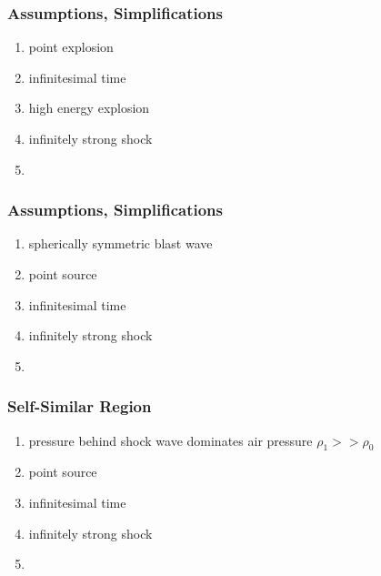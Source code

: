 \begin{frame}\frametitle{Assumptions, Simplifications}
\begin{enumerate}
	\item point explosion
	\item infinitesimal time
	\item high energy explosion
	\item infinitely strong shock
	\item 
\end{enumerate}
\end{frame}

\begin{frame}\frametitle{Assumptions, Simplifications}
\begin{enumerate}
	\item spherically symmetric blast wave
	\item point source
	\item infinitesimal time
	\item infinitely strong shock
	\item 
\end{enumerate}
\end{frame}

%
\begin{frame}\frametitle{Self-Similar Region}
\begin{enumerate}
	\item pressure behind shock wave dominates air pressure $\rho_{1} >> \rho_0$
	\item point source
	\item infinitesimal time
	\item infinitely strong shock
	\item 
\end{enumerate}
\end{frame}
%

\endinput  %
